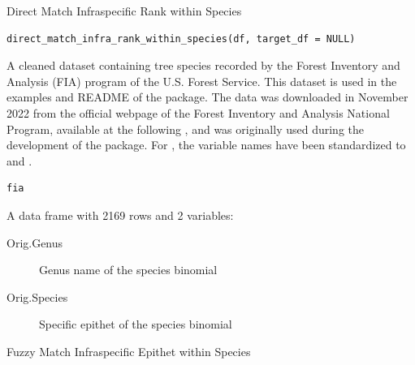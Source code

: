 \documentclass[a4paper]{book}
\begin{document}
%
\begin{Description}
Direct Match Infraspecific Rank within Species
\end{Description}
%
\begin{Usage}
\begin{verbatim}
direct_match_infra_rank_within_species(df, target_df = NULL)
\end{verbatim}
\end{Usage}
%
\begin{Description}
A cleaned dataset containing tree species recorded by the
Forest Inventory and Analysis (FIA) program of the U.S. Forest Service.
This dataset is used in the examples and README of the 
package. The data was downloaded in November 2022 from the official
webpage of the Forest Inventory and Analysis National Program, available
at the following ,
and was originally used during the development of the 
package. For , the variable names have been standardized
to  and .
\end{Description}
%
\begin{Usage}
\begin{verbatim}
fia
\end{verbatim}
\end{Usage}
%
\begin{Format}
A data frame with 2169 rows and 2 variables:
\begin{description}

\item[Orig.Genus] Genus name of the species binomial
\item[Orig.Species] Specific epithet of the species binomial

\end{description}

\end{Format}
%
\begin{Description}
Fuzzy Match Infraspecific Epithet within Species
\end{Description}
\end{document}
